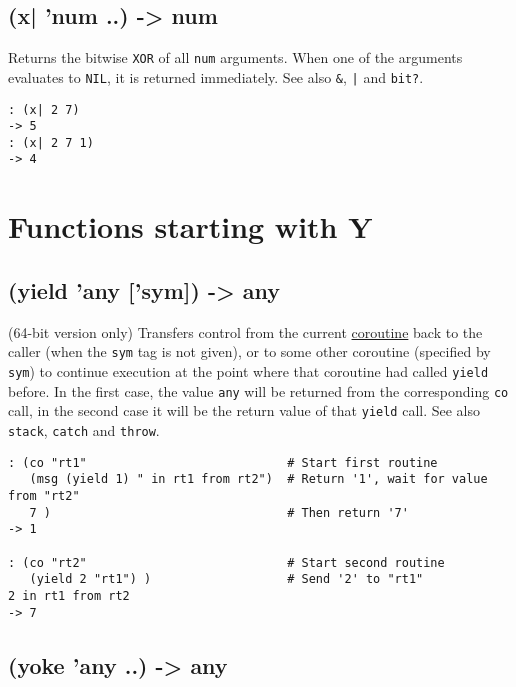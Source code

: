 {{{{{{{{ 
\section{(x| 'num ..) -> num}
\label{sec-8-1-24-3}


Returns the bitwise \texttt{XOR} of all \texttt{num} arguments. When one of the
arguments evaluates to \texttt{NIL}, it is returned immediately. See also \texttt{\&},
\texttt{|} and \texttt{bit?}.


\begin{verbatim}
: (x| 2 7)
-> 5
: (x| 2 7 1)
-> 4
\end{verbatim}



\chapter{Functions starting with Y}
\label{sec-8-1-25}


 
\section{(yield 'any ['sym]) -> any}
\label{sec-8-1-25-1}


(64-bit version only) Transfers control from the current
\hyperref[ref.html-coroutines]{coroutine} back to the caller (when the \texttt{sym}
tag is not given), or to some other coroutine (specified by \texttt{sym}) to
continue execution at the point where that coroutine had called \texttt{yield}
before. In the first case, the value \texttt{any} will be returned from the
corresponding \texttt{co} call, in the second case it will be the return value
of that \texttt{yield} call. See also \texttt{stack}, \texttt{catch} and \texttt{throw}.


\begin{verbatim}
: (co "rt1"                            # Start first routine
   (msg (yield 1) " in rt1 from rt2")  # Return '1', wait for value from "rt2"
   7 )                                 # Then return '7'
-> 1

: (co "rt2"                            # Start second routine
   (yield 2 "rt1") )                   # Send '2' to "rt1"
2 in rt1 from rt2
-> 7
\end{verbatim}

 
\section{(yoke 'any ..) -> any}
\label{sec-8-1-25-2}


}}}}}}}}
